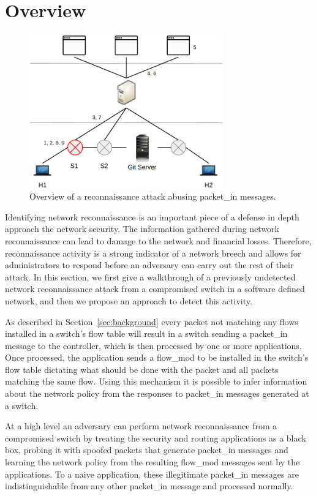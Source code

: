 \section{Overview}
\label{sec:overview}

\begin{figure}[t] 
  \centering 
  \includegraphics[width=3.3in]{img/overview.png}
  \caption{Overview of a reconnaissance attack abusing packet\_in
  messages.} 
  \label{fig:overview}
\end{figure}

Identifying network reconnaissance is an important piece of a defense 
in depth approach the network security. The information gathered during
network reconnaissance can lead to damage to the network and financial
losses. Therefore, reconnaissance activity is a strong indicator of a 
network breech and allows for administrators to respond before an 
adversary can carry out the rest of their attack. In this section, we 
first give a walkthrough of a previously undetected network 
reconnaissance attack from a compromised switch in a software defined network,
and then we propose an approach to detect this activity.

As described in Section~\ref{sec:background} every packet not matching 
any flows installed in a switch's flow table will result in a switch 
sending a packet\_in message to the controller, which is then
processed by one or more applications. Once processed, the application
sends a flow\_mod to be installed in the switch's flow table dictating
what should be done with the packet and all packets matching the same
flow. Using this mechanism it is possible to infer information about the
network policy from the responses to packet\_in messages generated at a
switch. 

At a high level an adversary can perform network reconnaissance from a
compromised switch by treating the security and routing applications as
a black box, probing it with spoofed packets that generate packet\_in 
messages and learning the network policy from the resulting flow\_mod 
messages sent by the applications. To a naive application, these 
illegitimate packet\_in messages are indistinguishable from any other 
packet\_in message and processed normally. 

